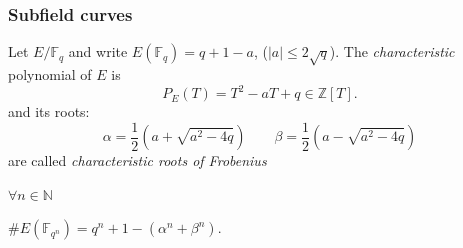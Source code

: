 \documentclass{beamer}%
\newcommand{\Z}{\mathbb Z}
\newcommand{\N}{\mathbb N}
\newcommand{\F}{\mathbb F}
\theoremstyle{definition}
\begin{document}
% 
% 

\begin{frame}\frametitle{Subfield curves}

\begin{definition}
Let $E/\F_q$ and write $E(\F_q)=q+1-a$, ($|a|\le2\sqrt{q}$). The \emph{characteristic}
polynomial of $E$ is
$$P_E(T)=T^2-aT+q\in\Z[T].$$
and its roots:
$$\alpha=\frac12\left(a+\sqrt{a^2-4q}\right)\qquad\beta=\frac12\left(a-\sqrt{a^2-4q}\right)$$
are called \emph{characteristic roots of Frobenius} %
\end{definition}\pause

\begin{theorem} $\forall n\in\N$
\centerline{$\#E(\F_{q^n})=q^n+1-(\alpha^n+\beta^n).$}
\end{theorem}
\end{frame}
\end{document}
